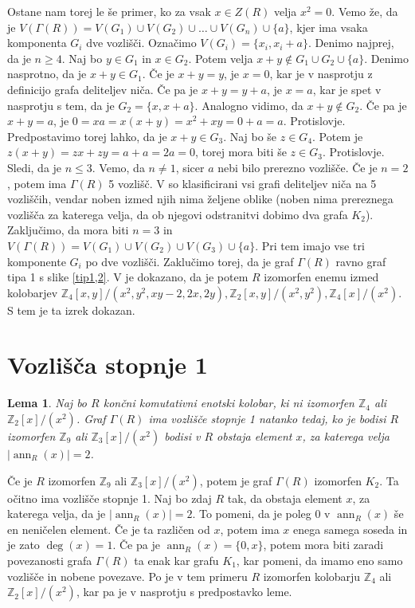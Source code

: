 \documentclass[a4paper, 12pt]{amsart}
\theoremstyle{definition} %
\theoremstyle{plain} %
\newtheorem{lema}[definicija]{Lema}
\newcommand{\Z}{\mathbb Z}
\DeclareMathOperator{\ann}{ann}
\begin{document}
Ostane nam torej le še primer, ko za vsak $x\in Z(R)$ velja $x^2 = 0$. Vemo že, da je $V(\Gamma(R)) = V(G_1) \cup V(G_2) \cup \dots \cup V(G_n) \cup \{a\}$, kjer ima vsaka komponenta $G_i$ dve vozlišči. Označimo $V(G_i) = \{x_i,x_i +a  \}$. Denimo najprej, da je $n\ge 4$. Naj bo $y\in G_1$ in $ x\in G_2$. Potem velja $x+y\notin G_1 \cup G_2 \cup \{a\}$. Denimo nasprotno, da je $x+y \in G_1$. Če je $x+y  = y$, je $x=0$, kar je v nasprotju z definicijo grafa deliteljev niča. Če pa je $x+y = y+a$, je $x=a$, kar je spet v nasprotju s tem, da je $G_2 = \{x,x+a\}$. Analogno vidimo, da $x+y\notin G_2$. Če pa je $x+y=a$, je $0 = xa = x(x+y) = x^2 + xy = 0+a = a$. Protislovje. Predpostavimo torej lahko, da je $x+y\in G_3$. Naj bo še $z\in G_4$. Potem je $z(x+y) = zx + zy = a +a = 2a = 0$, torej mora biti še $z\in G_3$. Protislovje. Sledi, da je $n\le 3$. Vemo, da $n\neq 1$, sicer $a$ nebi bilo prerezno vozlišče. Če je $n=2$, potem ima $\Gamma(R)$ 5 vozlišč. V \cite{Redmond} so klasificirani vsi grafi deliteljev niča na 5 vozliščih, vendar noben izmed njih nima željene oblike (noben nima prereznega vozlišča za katerega velja, da ob njegovi odstranitvi dobimo dva grafa $K_2$). Zaključimo, da mora biti $n=  3$ in $V( \Gamma(R)) = V(G_1) \cup V(G_2) \cup V(G_3) \cup \{a\}$. Pri tem imajo vse tri komponente $G_i$ po dve vozlišči. Zaklučimo torej, da je graf $\Gamma(R)$ ravno graf tipa 1 s slike \ref{tip1,2}. V \cite{Redmond} je dokazano, da je potem $R$ izomorfen enemu izmed kolobarjev $\Z_4[x,y]/(x^2,y^2,xy-2,2x,2y), \Z_2[x,y]/(x^2,y^2),\Z_4[x]/(x^2)$. S tem je ta izrek dokazan.


\endproof

\section{Vozlišča stopnje 1}

\begin{lema}
\label{vertexOfDegree1}
Naj bo $R$ končni komutativni enotski kolobar, ki ni izomorfen $\Z_4$ ali $\Z_2[x]/(x^2)$. Graf $\Gamma(R)$ ima vozlišče stopnje 1 natanko tedaj, ko je bodisi $R$ izomorfen $\Z_9$ ali $\Z_3[x]/(x^2)$ bodisi v $R$ obstaja element $x$, za katerega velja $|\ann_R(x) | = 2$.
\end{lema}

\proof
Če je $R$ izomorfen $\Z_9$ ali $\Z_3[x]/(x^2)$, potem je graf $\Gamma(R)$ izomorfen $K_2$. Ta očitno ima vozlišče stopnje 1. Naj bo zdaj $R$ tak, da obstaja element $x$, za katerega velja, da je $|\ann_R(x)| = 2$. To pomeni, da je poleg 0 v $\ann_R(x)$ še en neničelen element. Če je ta različen od $x$, potem ima $x$ enega samega soseda in je zato  $\deg(x) = 1$. Če pa je $\ann_R(x) = \{0,x\}$, potem mora biti zaradi povezanosti grafa $\Gamma(R)$ ta enak kar grafu $K_1$, kar pomeni, da imamo eno samo vozlišče in nobene povezave. Po \cite{Anderson-klasifikacijaMalihGrafov} je v tem primeru $R$ izomorfen kolobarju $\Z_4$ ali $\Z_2[x]/(x^2)$, kar pa je v nasprotju s predpostavko leme.
\end{document}
